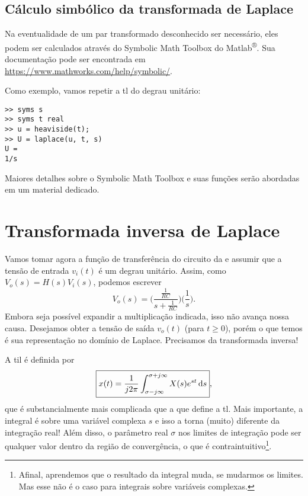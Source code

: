 \subsection{Cálculo simbólico da transformada de Laplace}

Na eventualidade de um par transformado desconhecido ser necessário, eles podem ser calculados através do Symbolic Math Toolbox do Matlab\textsuperscript{®}. Sua documentação pode ser encontrada em \url{https://www.mathworks.com/help/symbolic/}.

Como exemplo, vamos repetir a \ac{tl} do degrau unitário:
\begin{lstlisting}
>> syms s
>> syms t real
>> u = heaviside(t);
>> U = laplace(u, t, s)
U = 
1/s
\end{lstlisting}

Maiores detalhes sobre o Symbolic Math Toolbox e suas funções serão abordadas em um material dedicado.

\section{Transformada inversa de Laplace}

Vamos tomar agora a função de transferência do circuito da  e assumir que a tensão de entrada $v_i(t)$ é um degrau unitário. Assim, como $V_o(s)=H(s)V_i(s)$, podemos escrever
\begin{equation*}
	V_o(s)=\Big(\frac{\frac{1}{RC}}{s+\frac{1}{RC}}\Big)\Big(\frac{1}{s}\Big).
\end{equation*}
Embora seja possível expandir a multiplicação indicada, isso não avança nossa causa. Desejamos obter a tensão de saída $v_o(t)$ (para $t\geq0$), porém o que temos é sua representação no domínio de Laplace. Precisamos da transformada inversa!

A \ac{til} é definida por
\begin{equation}\label{eq:til}
	\boxed{x(t)=\frac{1}{j2\pi}\inte{X(s)e^{st}}{s}{\sigma-j\infty}{\sigma+j\infty}},
\end{equation}
que é substancialmente mais complicada que a  que define a \ac{tl}. Mais importante, a integral é sobre uma variável complexa $s$ e isso a torna (muito) diferente da integração real! Além disso, o parâmetro real $\sigma$ nos limites de integração pode ser qualquer valor dentro da região de convergência, o que é contraintuitivo\footnote{Afinal, aprendemos que o resultado da integral muda, se mudarmos os limites. Mas esse não é o caso para integrais sobre variáveis complexas.}.

